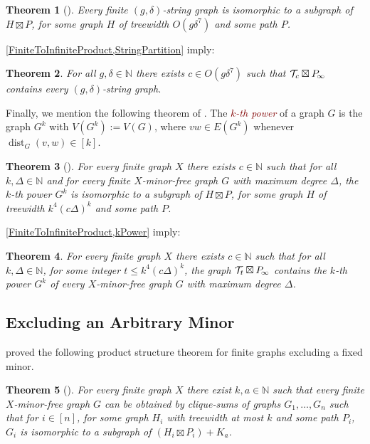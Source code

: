 \documentclass[a4paper,11pt]{article}
\newcommand{\DefnIndex}[2]{\textcolor{Maroon}{\emph{#1}}\index{#2}}
\theoremstyle{plain}
\newtheorem{thm}{Theorem}[section]
\theoremstyle{definition}
\renewcommand{\leq}{\leqslant}
\DeclareMathOperator{\dist}{dist}
\newcommand{\PP}{P_{\hspace{-0.25ex}\infty}}
\newcommand{\TT}{\mathcal{T}}
\newcommand{\NN}{\mathbb{N}}
\begin{document}
\begin{thm}[\citep{DMW19b}] 
\label{StringPartition}
Every finite  $(g,\delta)$-string graph is isomorphic to a subgraph of $H\boxtimes P$, for some graph $H$ of treewidth $O(g\delta^7)$ and some path $P$.
\end{thm}

\cref{FiniteToInfiniteProduct,StringPartition} imply:

\begin{thm}
For all $g,\delta\in\NN$ there exists $c\in O(g\delta^7)$ such that $\TT_c \boxtimes \PP$ contains every  $(g,\delta)$-string graph.
\end{thm}

Finally, we mention the following theorem of \citet{DMW19b}. The \DefnIndex{$k$-th power}{power} of a graph $G$ is the graph $G^k$ with $V(G^k):=V(G)$, where $vw\in E(G^k)$ whenever $\dist_G(v,w)\in[k]$. 

\begin{thm}[\citep{DMW19b}] 
\label{kPower}
For every finite graph $X$ there exists $c\in\NN$ such that for all $k,\Delta\in\NN$ and for every finite $X$-minor-free graph $G$ with maximum degree $\Delta$, the $k$-th power $G^k$ is isomorphic to a subgraph of $H\boxtimes P$, for some graph $H$ of treewidth $k^4(c\Delta)^{k}$ and some path $P$.
\end{thm}

\cref{FiniteToInfiniteProduct,kPower} imply:

\begin{thm}
For every finite graph $X$ there exists $c\in\NN$ such that for all $k,\Delta\in\NN$, for some integer $t\leq k^4(c\Delta)^{k}$, the graph
$\TT_t\boxtimes \PP$ contains the $k$-th power $G^k$ of every  $X$-minor-free graph $G$ with maximum degree $\Delta$.
\end{thm}

\subsection{Excluding an Arbitrary Minor}
\label{ExcludedMinors}

\citet{DJMMUW20} proved the following product structure theorem for finite graphs excluding a fixed minor. 

\begin{thm}[\citep{DJMMUW20}] 
\label{MinorProduct}
For every finite graph $X$ there exist $k,a\in\mathbb{N}$ such that every finite $X$-minor-free graph $G$ can be obtained by clique-sums of graphs $G_1,\dots,G_n$ such that for  $i\in[n]$, 
for some graph $H_i$ with treewidth at most $k$ and some path $P_i$, $G_i$ is isomorphic to a subgraph of $(H_i  \boxtimes P_i ) + K_a$. 
\end{thm}
\end{document}
